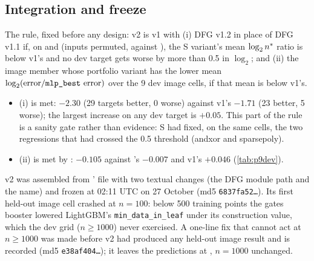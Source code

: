 \subsection{Integration and freeze}\label{sec:p9int}

The rule, fixed before any design: v2 is v1 with (i) DFG v1.2 in place of DFG v1.1 if, on  and  (inputs permuted, against ), the S variant's mean $\log_2n^{*}$ ratio is below v1's and no dev target gets worse by more than 0.5 in $\log_2$; and (ii) the image member whose portfolio variant has the lower mean $\log_2(\text{error}/\text{\code{mlp_best} error})$ over the 9 dev image cells, if that mean is below v1's.
\begin{itemize}
\item (i) is met: $-2.30$ (29 targets better, 0 worse) against v1's $-1.71$ (23 better, 5 worse); the largest increase on any dev target is $+0.05$. This part of the rule is a sanity gate rather than evidence: S had fixed, on the same cells, the two regressions that had crossed the 0.5 threshold (andxor and sparsepoly).
\item (ii) is met by : $-0.105$ against 's $-0.007$ and v1's $+0.046$ (\cref{tab:p9dev}).
\end{itemize}
v2 was assembled from ' file with two textual changes (the DFG module path and the name) and frozen at 02:11 UTC on 27 October (md5 \texttt{6837fa52\ldots}). Its first held-out image cell crashed at $n=100$: below 500 training points the gates booster lowered LightGBM's \texttt{min\_data\_in\_leaf} under its construction value, which the dev grid ($n\ge1000$) never exercised. A one-line fix that cannot act at $n\ge1000$ was made before v2 had produced any held-out image result and is recorded (md5 \texttt{e38af404\ldots}); it leaves the predictions at , $n=1000$ unchanged.

